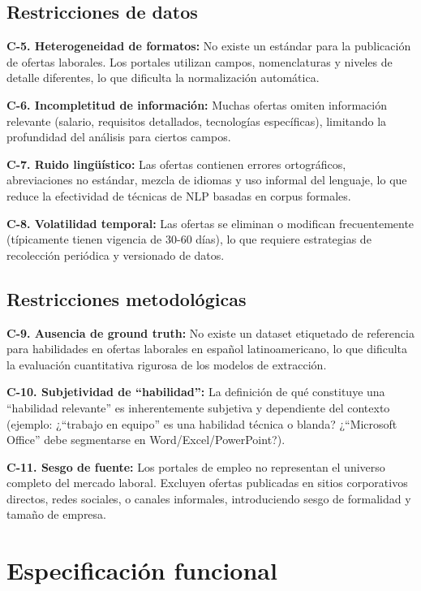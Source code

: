 \subsection{Restricciones de datos}

\textbf{C-5. Heterogeneidad de formatos:} No existe un estándar para la publicación de ofertas laborales. Los portales utilizan campos, nomenclaturas y niveles de detalle diferentes, lo que dificulta la normalización automática.

\textbf{C-6. Incompletitud de información:} Muchas ofertas omiten información relevante (salario, requisitos detallados, tecnologías específicas), limitando la profundidad del análisis para ciertos campos.

\textbf{C-7. Ruido lingüístico:} Las ofertas contienen errores ortográficos, abreviaciones no estándar, mezcla de idiomas y uso informal del lenguaje, lo que reduce la efectividad de técnicas de NLP basadas en corpus formales.

\textbf{C-8. Volatilidad temporal:} Las ofertas se eliminan o modifican frecuentemente (típicamente tienen vigencia de 30-60 días), lo que requiere estrategias de recolección periódica y versionado de datos.

\subsection{Restricciones metodológicas}

\textbf{C-9. Ausencia de ground truth:} No existe un dataset etiquetado de referencia para habilidades en ofertas laborales en español latinoamericano, lo que dificulta la evaluación cuantitativa rigurosa de los modelos de extracción.

\textbf{C-10. Subjetividad de ``habilidad'':} La definición de qué constituye una ``habilidad relevante'' es inherentemente subjetiva y dependiente del contexto (ejemplo: ¿``trabajo en equipo'' es una habilidad técnica o blanda? ¿``Microsoft Office'' debe segmentarse en Word/Excel/PowerPoint?).

\textbf{C-11. Sesgo de fuente:} Los portales de empleo no representan el universo completo del mercado laboral. Excluyen ofertas publicadas en sitios corporativos directos, redes sociales, o canales informales, introduciendo sesgo de formalidad y tamaño de empresa.

\section{Especificación funcional}

